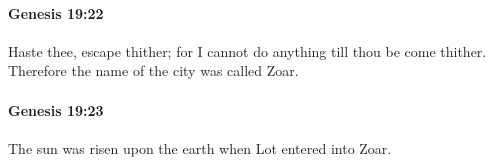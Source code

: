 		\paragraph{Genesis 19:22} %
			\label{GENESIS-19-22}

			Haste thee, escape thither; for I cannot do anything till thou be come thither. Therefore the name of the city was called Zoar.


		\paragraph{Genesis 19:23} %
			\label{GENESIS-19-23}

			The sun was risen upon the earth when Lot entered into Zoar.


